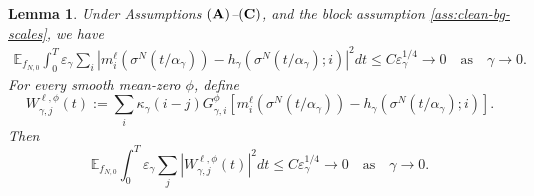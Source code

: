 \documentclass{article}
\newtheorem{lemma}{Lemma}
\begin{document}
\begin{lemma}\label{lem:clean-strong-kac-defect}
Under Assumptions \(({\bf A})\)--\(({\bf C})\), and the block assumption \eqref{ass:clean-bg-scales}, we have
\begin{align}\label{eq:centered-block-to-kac-L2-rate-main}
    \mathbb E_{f_{N,0}}\int_0^T
\varepsilon_\gamma\sum_i
\left|
 m_i^\ell(\sigma^N(t/\alpha_\gamma))
-h_\gamma(\sigma^N(t/\alpha_\gamma);i)
\right|^2dt 
\le C\varepsilon^{1/4}_{\gamma} \to 0 \quad \text{as} \quad \gamma \to 0.
\end{align}
For every smooth mean-zero \(\phi\), define
\[
W_{\gamma,j}^{\ell,\phi}(t)
:=
\sum_i
\kappa_\gamma(i-j)G_{\gamma,i}^{\phi}
\left[
 m_i^\ell(\sigma^N(t/\alpha_\gamma))
-h_\gamma(\sigma^N(t/\alpha_\gamma);i)
\right].
\]
Then
\begin{equation}\label{eq:kac-covariance}
    \mathbb E_{f_{N,0}}\int_0^T \varepsilon_\gamma\sum_j
\left|W_{\gamma,j}^{\ell,\phi}(t)\right|^2dt
\le C\varepsilon^{1/4}_{\gamma}  \to 0 \quad \text{as} \quad \gamma \to 0.
\end{equation}
\end{lemma}
\end{document}
